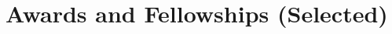 \documentclass[11pt,a4paper,roman]{moderncv}        %
\begin{document}
\section{Awards and Fellowships (Selected)}

\end{document}

